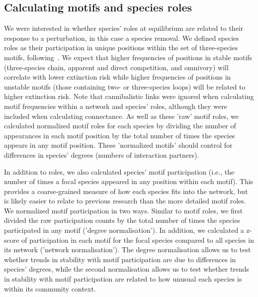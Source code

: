 \documentclass[12pt]{article}
\begin{document}
	\subsection*{Calculating motifs and species roles}

		We were interested in whether species' roles at equilibrium are related to their response to a perturbation, in this case a species removal. We defined species roles as their participation in unique positions within the set of three-species motifs, following~\citet{Stouffer2012,Cirtwill2015}. We expect that higher frequencies of positions in stable motifs (three-species chain, apparent and direct competition, and omnivory) will correlate with lower extinction risk while higher frequencies of positions in unstable motifs (those containing two- or three-species loops) will be related to higher extinction risk.	Note that cannibalistic links were ignored when calculating motif frequencies within a network and species' roles, although they were included when calculating connectance. As well as these 'raw' motif roles, we calculated normalized motif roles for each species by dividing the number of appearances in each motif position by the total number of times the species appears in any motif position. These 'normalized motifs' should control for differences in species' degrees (numbers of interaction partners).


		In addition to roles, we also calculated species' motif participation (i.e., the number of times a focal species appeared in any position within each motif). This provides a coarse-grained measure of how each species fits into the network, but is likely easier to relate to previous research than the more detailed motif roles. We normalized motif participation in two ways. Similar to motif roles, we first divided the raw participation counts by the total number of times the species participated in any motif ('degree normalisation'). In addition, we calculated a z-score of participation in each motif for the focal species compared to all species in its network ('network normalisation'). The degree normalisation allows us to test whether trends in stability with motif participation are due to differences in species' degrees, while the second normalisation allows us to test whether trends in stability with motif participation are related to how unusual each species is within its community context.
\end{document}

